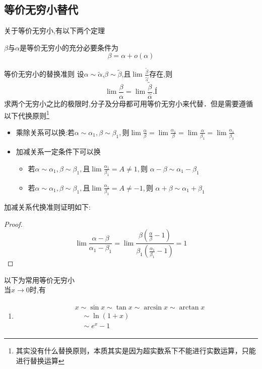 \documentclass[12pt, a4paper, oneside, UTF8]{ctexbook}
\begin{document}
\begin{sloppypar}
    \subsection{等价无穷小替代}
    关于等价无穷小,有以下两个定理
    \begin{defn}{}{}
        $\beta$与$\alpha$是等价无穷小的充分必要条件为
        $$
            \beta=\alpha + o(\alpha)
        $$
    \end{defn}
    \begin{defn}{等价无穷小的替换准则}{}
        设$\alpha\sim\widetilde{\alpha}$,$\beta\sim\widetilde{\beta}$,且$\lim\frac{\widetilde{\beta}}{\underset{\alpha}{\operatorname*{\sim}}}$存在,则
        $$
            \lim\frac{\beta}{\alpha}=\lim\frac{\widetilde{\beta}}{\overset{\sim}{\alpha}}.Í
        $$
        求两个无穷小之比的极限时,分子及分母都可用等价无穷小来代替．但是需要遵循以下代换原则\footnote{其实没有什么替换原则，本质其实是因为超实数系下不能进行实数运算，只能进行替换运算}
        \begin{itemize}
            \item 乘除关系可以换:若$\alpha\sim\alpha_1,\beta\sim\beta_1,\text{则}\lim\frac\alpha\beta=\lim\frac{\alpha_1}\beta=\lim\frac\alpha{\beta_1}=\lim\frac{\alpha_1}{\beta_1}$
            \item 加减关系一定条件下可以换
                  \begin{itemize}
                      \item 若$\alpha\sim\alpha_{1},\beta\sim\beta_{1},\text{且}\operatorname*{lim}\frac{\alpha_{1}}{\beta_{1}}=A\neq1,\text{则 }\alpha-\beta\sim\alpha_{1}-\beta_{1}$
                      \item 若$\alpha\sim\alpha_{1},\beta\sim\beta_{1},\text{且}\operatorname*{lim}\frac{\alpha_{1}}{\beta_{1}}=A\neq-1,\text{则 }\alpha+\beta\sim\alpha_{1}+\beta_{1}$
                  \end{itemize}
        \end{itemize}
        加减关系代换准则证明如下:
        \begin{proof}
            $$\lim \frac{\alpha-\beta}{\alpha_1 -\beta_1}=\lim \frac{\beta (\frac{\alpha}{\beta}-1)}{\beta_1(\frac{\alpha_1}{\beta_1}-1)}=1$$
        \end{proof}
    \end{defn}
    以下为常用等价无穷小
    \\当$x \to 0$时,有
    \begin{enumerate}
        \item     \begin{align*} \boxed{\begin{aligned}& x \sim \sin x \sim \tan x \sim \arcsin x \sim \arctan x \nonumber \\& \quad  \sim \ln (1+x)  \nonumber                                  \\& \quad \sim e^x -1 \nonumber\end{aligned} }\end{align*}

\end{enumerate}
\end{sloppypar}
\end{document}
